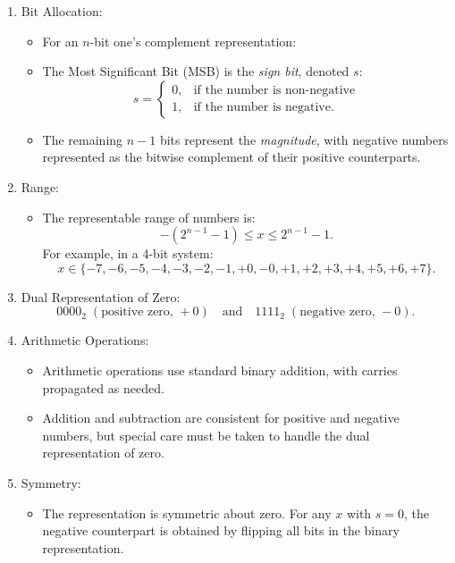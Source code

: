 \begin{enumerate}[left=1cm]
    \item Bit Allocation:
    \begin{itemize}
        \item For an \( n \)-bit one's complement representation:
        \item The Most Significant Bit (MSB) is the \textit{sign bit}, denoted \( s \):
       \[
       s = 
       \begin{cases} 
       0, & \text{if the number is non-negative} \\
       1, & \text{if the number is negative.}
       \end{cases}
       \]
        \item The remaining \( n-1 \) bits represent the \textit{magnitude}, with negative numbers represented as the bitwise complement of their positive counterparts.
    \end{itemize}

    \item Range:
    \begin{itemize}
        \item The representable range of numbers is:
     \[
     -(2^{n-1} - 1) \leq x \leq 2^{n-1} - 1.
     \]
     For example, in a 4-bit system:
     \[
     x \in \{-7, -6, -5, -4, -3, -2, -1, +0, -0, +1, +2, +3, +4, +5, +6, +7\}.
     \]
     \end{itemize}

    \item Dual Representation of Zero:
     \[
     0000_2 \; (\text{positive zero, } +0) \quad \text{and} \quad 1111_2 \; (\text{negative zero, } -0).
     \]

    \item Arithmetic Operations:
    \begin{itemize}
        \item Arithmetic operations use standard binary addition, with carries propagated as needed.
        \item Addition and subtraction are consistent for positive and negative numbers, but special care must be taken to handle the dual representation of zero.
    \end{itemize}

    \item Symmetry:
    \begin{itemize}
        \item The representation is symmetric about zero. For any \( x \) with \( s = 0 \), the negative counterpart is obtained by flipping all bits in the binary representation.
    \end{itemize}


\end{enumerate}
